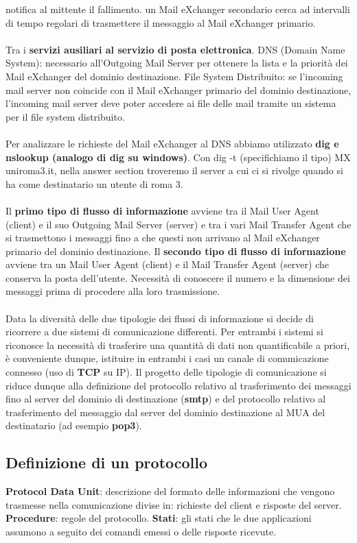 \documentclass{article}
\begin{document}
notifica al mittente il fallimento. un Mail eXchanger secondario cerca ad intervalli di tempo regolari di trasmettere il messaggio al Mail eXchanger primario.\\\\
Tra i \textbf{servizi ausiliari al servizio di posta elettronica}. DNS (Domain Name System): necessario all’Outgoing Mail Server per ottenere la lista e la priorità dei Mail eXchanger del dominio destinazione. File System Distribuito: se l’incoming mail server non coincide con il Mail eXchanger primario del dominio destinazione, l’incoming mail server deve poter accedere ai file delle mail tramite un sistema per il file system distribuito.\\\\
Per analizzare le richieste del Mail eXchanger al DNS abbiamo utilizzato \textbf{dig e nslookup (analogo di dig su windows)}. Con dig -t (specifichiamo il tipo) MX uniroma3.it, nella answer section troveremo il server a cui ci si rivolge quando si ha come destinatario un utente di roma 3.\\\\
Il \textbf{primo tipo di flusso di informazione} avviene tra il Mail User Agent (client) e il suo Outgoing Mail Server (server) e tra i vari Mail Transfer Agent che si trasmettono i messaggi fino a che questi non arrivano al Mail eXchanger primario del dominio destinazione. Il \textbf{secondo tipo di flusso di informazione} avviene tra un Mail User Agent (client) e il Mail Transfer Agent (server) che conserva la posta dell'utente. Necessità di conoscere il numero e la dimensione dei messaggi prima di procedere alla loro trasmissione.\\\\
Data la diversità delle due tipologie dei flussi di informazione si decide di ricorrere a due sistemi di comunicazione differenti. Per entrambi i sistemi si riconosce la necessità di trasferire una quantità di dati non quantificabile a priori, è conveniente dunque, istituire in entrambi i casi un canale di comunicazione connesso (uso di \textbf{TCP} su IP). Il progetto delle tipologie di comunicazione si riduce dunque alla definizione del protocollo relativo al trasferimento dei messaggi fino al server del dominio di destinazione (\textbf{smtp}) e del protocollo relativo al trasferimento del messaggio dal server del dominio destinazione al MUA del destinatario (ad esempio \textbf{pop3}).
\subsection{Definizione di un protocollo}
\textbf{Protocol Data Unit}: descrizione del formato delle informazioni che vengono trasmesse nella comunicazione divise in: richieste del client e risposte del server. \textbf{Procedure}: regole del protocollo. \textbf{Stati}: gli stati che le due applicazioni assumono a seguito dei comandi emessi o delle risposte ricevute.
\end{document}
